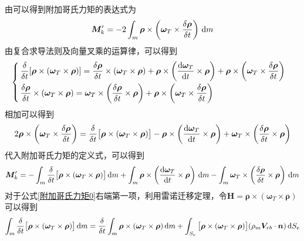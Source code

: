 由\peref[绕质心的运动方程]可以得到附加哥氏力矩的表达式为
\begin{equation}
	\bm{M}'_k = - 2 \int_m \bm{\rho}\times \left(\bm{\omega}_T \times \dfrac{\delta \bm{\rho}}{\delta t}\right)\, {\rm{d}} m
\end{equation}
由复合求导法则及向量叉乘的运算律，可以得到
\begin{equation*}
	\begin{cases}
		\, \dfrac{\delta }{\delta t} [\bm{\rho} \times (\bm{\omega}_T \times \bm{\rho})] = \dfrac{\delta \bm{\rho}}{\delta t} \times (\bm{\omega}_T \times \bm{\rho}) + \bm{\rho} \times \left(\dfrac{{\rm{d}} \bm{\omega}_T}{{\rm{d}} t} \times \bm{\rho}\right) + \bm{\rho}\times \left(\bm{\omega}_T \times \dfrac{\delta \bm{\rho}}{\delta t}\right) \\[0.8em]
	
		\, \dfrac{\delta \bm{\rho}}{\delta t} \times (\bm{\omega}_T \times \bm{\rho}) = \bm{\omega}_T \times \left(\dfrac{\delta \bm{\rho}}{\delta t} \times \bm{\rho}\right) + \bm{\rho}\times \left(\bm{\omega}_T \times \dfrac{\delta \bm{\rho}}{\delta t}\right) 
	\end{cases}
\end{equation*}
相加可以得到
\begin{equation}
	2 \bm{\rho}\times \left(\bm{\omega}_T \times \dfrac{\delta \bm{\rho}}{\delta t}\right) = \dfrac{\delta}{\delta t}\big[\bm{\rho}\times (\bm{\omega}_T \times \bm{\rho})\big] - \bm{\rho}\times\left(\dfrac{{\rm{d}} \bm{\omega}_T}{{\rm{d}} t} \times \bm{\rho}\right) + \bm{\omega}_T \times \left(\dfrac{\delta \bm{\rho}}{\delta t} \times \bm{\rho}\right)
\end{equation}
代入附加哥氏力矩的定义式，可以得到
\begin{equation}
	\bm{M}'_k = - \int_m \dfrac{\delta}{\delta t}\big[\bm{\rho}\times (\bm{\omega}_T \times \bm{\rho})\big] \, {\rm{d}} m +  \int_m \bm{\rho}\times\left(\dfrac{{\rm{d}} \bm{\omega}_T}{{\rm{d}} t} \times \bm{\rho}\right) \, {\rm{d}} m - \int_m \bm{\omega}_T \times \left(\dfrac{\delta \bm{\rho}}{\delta t} \times \bm{\rho}\right) \, {\rm{d}} m
	\label{附加哥氏力矩0}
\end{equation}
对于公式\eqref{附加哥氏力矩0}右端第一项，利用雷诺迁移定理，令$\bm{H} = \bm{\rho}\times (\bm{\omega}_T \times \bm{\rho})$可以得到
\begin{equation}
	\int_m \dfrac{\delta}{\delta t}\big[\bm{\rho}\times (\bm{\omega}_T \times \bm{\rho})\big] \, {\rm{d}} m = \dfrac{\delta }{\delta t} \int_m \bm{\rho}\times (\bm{\omega}_T \times \bm{\rho}) \, {\rm{d}} m + \int_{S_e} \big[\bm{\rho}\times (\bm{\omega}_T \times \bm{\rho})\big](\rho_m \bm{V}_{rb}\cdot \bm{n}) \, {\rm{d}} S_e
\end{equation}
